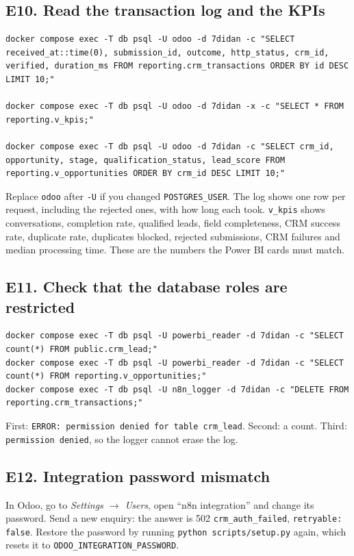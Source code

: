 \documentclass[11pt,a4paper]{article}
\newcommand{\f}[1]{\texttt{#1}}
\begin{document}
\subsection{E10. Read the transaction log and the KPIs}
\begin{lstlisting}
docker compose exec -T db psql -U odoo -d 7didan -c "SELECT received_at::time(0), submission_id, outcome, http_status, crm_id, verified, duration_ms FROM reporting.crm_transactions ORDER BY id DESC LIMIT 10;"

docker compose exec -T db psql -U odoo -d 7didan -x -c "SELECT * FROM reporting.v_kpis;"

docker compose exec -T db psql -U odoo -d 7didan -c "SELECT crm_id, opportunity, stage, qualification_status, lead_score FROM reporting.v_opportunities ORDER BY crm_id DESC LIMIT 10;"
\end{lstlisting}
Replace \f{odoo} after \f{-U} if you changed \f{POSTGRES\_USER}. The log shows one row per request,
including the rejected ones, with how long each took. \f{v\_kpis} shows conversations, completion
rate, qualified leads, field completeness, CRM success rate, duplicate rate, duplicates blocked,
rejected submissions, CRM failures and median processing time. These are the numbers the Power BI
cards must match.

\subsection{E11. Check that the database roles are restricted}
\begin{lstlisting}
docker compose exec -T db psql -U powerbi_reader -d 7didan -c "SELECT count(*) FROM public.crm_lead;"
docker compose exec -T db psql -U powerbi_reader -d 7didan -c "SELECT count(*) FROM reporting.v_opportunities;"
docker compose exec -T db psql -U n8n_logger -d 7didan -c "DELETE FROM reporting.crm_transactions;"
\end{lstlisting}
\begin{expect}
First: \f{ERROR: permission denied for table crm\_lead}. Second: a count. Third:
\f{permission denied}, so the logger cannot erase the log.
\end{expect}

\subsection{E12. Integration password mismatch}
In Odoo, go to \emph{Settings $\rightarrow$ Users}, open ``n8n integration'' and change its password.
Send a new enquiry: the answer is 502 \f{crm\_auth\_failed}, \f{retryable: false}. Restore the
password by running \f{python scripts/setup.py} again, which resets it to
\f{ODOO\_INTEGRATION\_PASSWORD}.
\end{document}
